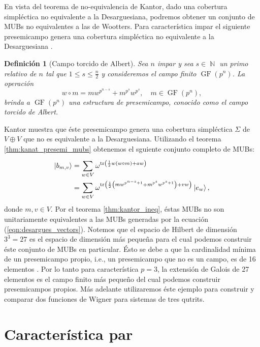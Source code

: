 \documentclass[a4paper,11pt]{report}
\DeclareMathOperator{\N}{\mathbb{N}}
\DeclareMathOperator{\tr}{tr}
\DeclareMathOperator{\GF}{GF}
\newtheorem{definition}{Definición}
\begin{document}
  En vista del teorema de no-equivalencia de Kantor, dado
  una cobertura simpléctica no equivalente a la
  Desarguesiana, podremos obtener un conjunto de MUBs no
  equivalentes a las de Wootters. Para característica impar
  el siguiente presemicampo genera una cobertura simpléctica
  no equivalente a la Desarguesiana \cite{kantor1982}.
  \begin{definition}[Campo torcido de Albert]
    \label{def:alberts_spread}
    Sea $n$ impar y sea $s \in \N$ un primo relativo de $n$
    tal que $1 \leq s \leq \frac{n}{2}$ y consideremos el
    campo finito $\GF(p^{n})$. La operación
    \begin{equation}
      w \circ m
      = mw^{p^{n-s}} + m^{p^{s}} w^{p^{s}},
      \quad m \in \GF(p^{n}),
    \end{equation}
    brinda a $\GF(p^{n})$ una estructura de presemicampo,
    conocido como el campo torcido de Albert.
  \end{definition}
  Kantor muestra que éste presemicampo genera una cobertura
  simpléctica $\Sigma$ de $V \oplus V$ que no es equivalente
  a la Desarguesiana. Utilizando el teorema
  \ref{thm:kanat_presemi_mubs} obtenemos el sguiente
  conjunto completo de MUBs:
  \begin{align}
    \ket{b_{m,v}}
    &= \sum_{w \in V}^{}
    \omega^{\tr\left(
      \frac{1}{2} w (w \circ m) + a w
    \right) } \\
    &= \sum_{w \in V}^{}
    \omega^{\tr\left(
      \frac{1}{2}
      \left(
        mw^{p^{n-s}+1} + m^{p^{s}}w^{p^{s}+1}
      \right) + v w
    \right) } \ket{e_w},
  \end{align}
  donde $m, v \in V$. Por el teorema \ref{thm:kantor_ineq},
  éstas MUBs no son unitariamente equivalentes a las MUBs
  generadas por la ecuación (\ref{eqn:desargues_vectors}).
  Notemos que el espacio de Hilbert de dimensión $3^{3} =
  27$ es el espacio de dimensión más pequeña para el cual
  podemos construir éste conjunto de MUBs en particular.
  Ésto se debe a que la cardinalidad mínima de un
  presemicampo propio, i.e., un presemicampo que no es un
  campo, es de 16 elementos \cite{dembowski1968}. Por lo
  tanto para característica $p = 3$, la extensión de Galois
  de 27 elementos es el campo finito más pequeño del cual
  podemos construir presemicampos propios.  Más adelante 
  utilizaremos éste ejemplo para construir y comparar dos
  funciones de Wigner para sistemas de tres qutrits.
    
  \section{Característica par}
\end{document}

